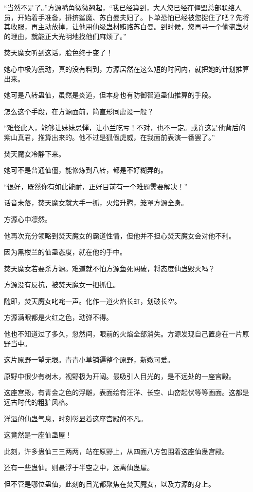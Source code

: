 \begin{this_body}
“当然不是了。”方源嘴角微微翘起，“我已经算到，大人您已经在僵盟总部联络人员，开始着手准备，排挤鲨魔、苏白曼夫妇了。卜单恐怕已经被您捉住了吧？先将其收服，再主动放掉，让他用仙级蛊材贿赂苏白曼。到时候，您再寻一个偷盗蛊材的理由，就能正大光明地找他们麻烦了。”

焚天魔女听到这话，脸色终于变了！

她心中极为震动，真的没有料到，方源居然在这么短的时间内，就把她的计划推算出来。

她可是八转蛊仙，虽然是炎道，但本身也有防御智道蛊仙推算的手段。

怎么这个手段，在方源面前，简直形同虚设一般？

“难怪此人，能够让妹妹忌惮，让小兰吃亏！不对，也不一定。或许这是他背后的紫山真君，推算出来的。他不过是狐假虎威，在我面前表演一番罢了。”

焚天魔女冷静下来。

她可不是普通仙僵，能修炼到八转，都是不好糊弄的。

“很好，既然你有如此能耐，正好目前有一个难题需要解决！”

话音未落，焚天魔女就大手一抓，火焰升腾，笼罩方源全身。

方源心中凛然。

他再次充分领略到焚天魔女的霸道性情，但他并不担心焚天魔女会对他不利。

因为黑楼兰的仙蛊态度，就在他的手中。

焚天魔女若要杀方源。难道就不怕方源鱼死网破，将态度仙蛊毁灭吗？

方源没有反抗，被焚天魔女一把抓住。

随即，焚天魔女叱咤一声。化作一道火焰长虹，划破长空。

方源满眼都是火红之色，动弹不得。

他也不知道过了多久，忽然间，眼前的火焰全部消失。方源发现自己置身在一片原野当中。

这片原野一望无垠。青青小草铺遍整个原野，新嫩可爱。

原野中很少有树木，视野极为开阔。最吸引人目光的，是不远处的一座宫殿。

这座宫殿，有青金之色的浮雕，表面绘有汪洋、长空、山峦起伏等等画面。这都是远古时代的粗犷风格。

洋溢的仙蛊气息，时刻彰显着这座宫殿的不凡。

这竟然是一座仙蛊屋！

此刻，许多蛊仙三三两两，站在原野上，从四面八方包围着这座仙蛊宫殿。

还有一些蛊仙。则悬浮于半空之中，远离仙蛊屋。

但不管是哪位蛊仙，此刻的目光都聚焦在焚天魔女，以及方源的身上。


\end{this_body}
